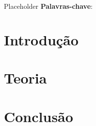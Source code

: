 \documentclass[10pt,twoside,a4paper,brazil]{abntex2}
\begin{document}
   \imprimircapa
   \imprimirfolhaderosto
   \tableofcontents

   \begin{resumo}
      Placeholder
      \vspace{\onelineskip}
      \noindent
      \textbf{Palavras-chave}:
   \end{resumo}

   \chapter{Introdução}
      
      
    \chapter{Teoria}
      

   \chapter{Conclusão}
      

   
\end{document}

